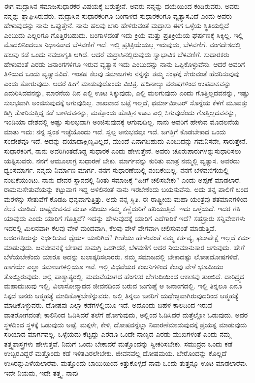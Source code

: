 ಈಗ ಮದ್ರಾಸಿನ ಸಮಾಜಸುಧಾರಕರ ವಿಷಯಕ್ಕೆ ಬರುತ್ತೇನೆ. ಅವರು ನನ್ನನ್ನು ದಯೆಯಿಂದ ಕಂಡಿರುವರು. ಅವರು ನನ್ನನ್ನು ಶ್ಲಾಘಿಸಿರುವರು. ಮದ್ರಾಸಿನ ಸುಧಾರಕರಿಗೂ ಬಂಗಾಳದ ಸುಧಾರಕರಿಗೂ ವ್ಯತ್ಯಾಸವಿದೆ ಎಂದು ಅವರು ಹೇಳುವುದನ್ನು ನಾನು ಒಪ್ಪುತ್ತೇನೆ. ನಾನು ಹಲವು ಬಾರಿ ಹೇಳಿರುವಂತೆ ಮದ್ರಾಸು ಈಗ ಒಳ್ಳೆಯ ಸ್ಥಿತಿಯಲ್ಲಿದೆ ಎಂಬುದು ಎಲ್ಲರಿಗೂ ಗೊತ್ತಿರಬಹುದು. ಬಂಗಾಳದಂತೆ ಇದು ಕ್ರಿಯೆ ಮತ್ತು ಪ್ರತಿಕ್ರಿಯೆಯ ಘರ್ಷಣಕ್ಕೆ ಸಿಕ್ಕಿಲ್ಲ. ಇಲ್ಲಿ ಮೊದಲಿನಿಂದಲೂ ನಿಧಾನವಾದ ಬೆಳವಣಿಗೆ ಇದೆ. ಇಲ್ಲಿ ಪ್ರತಿಕ್ರಿಯೆಯಲ್ಲ ಇರುವುದು, ಬೆಳವಣಿಗೆ. ವಂಗದೇಶದಲ್ಲಿ ಹಲವು ಕಡೆ ಒಂದು ನವಜಾಗೃತಿ ಆಗಿದೆ. ಆದರೆ ಮದ್ರಾಸಿನಲ್ಲಿರುವುದು ಸ್ವಾಭಾವಿಕ ಬೆಳವಣಿಗೆ. ಸುಧಾರಕರು ಹೇಳುವಂತೆ ಎರಡು ಜನಾಂಗಗಳಿಗೂ ಇರುವ ವ್ಯತ್ಯಾಸ ಇದು ಎಂಬುದನ್ನು ನಾನು ಒಪ್ಪಿಕೊಳ್ಳುವೆನು. ಆದರೆ ಅವರಿಗೆ ತಿಳಿಯದ ಒಂದು ವ್ಯತ್ಯಾಸವಿದೆ. ಇಂತಹ ಕೆಲವು ಸಮಾಜಗಳು ನನ್ನನ್ನು ತಮ್ಮ ಸಂಘಕ್ಕೆ ಸೇರುವಂತೆ ಹೆದರಿಸುವುವು ಎಂದು ತೋರುವುದು. ಆದರೆ ಹೀಗೆ ಮಾಡುವುದೊಂದು ವಿಚಿತ್ರ. ಹದಿನಾಲ್ಕು ವರುಷಗಳಿಂದ ಉಪವಾಸವನ್ನು ಎದುರಿಸಿದವನನ್ನು, ಮಾರನೆಯ ದಿನ ಎಲ್ಲಿ ಊಟ ಸಿಕ್ಕುವುದು, ಎಲ್ಲಿ ಮಲಗುವುದು ಎಂದು ಗೊತ್ತಿಲ್ಲದವನನ್ನು, ಇಷ್ಟು ಸುಲಭವಾಗಿ ಅಂಜಿಸುವುದಕ್ಕೆ ಆಗುವುದಿಲ್ಲ. ಶಾಖವಾದ ಬಟ್ಟೆ ಇಲ್ಲದೆ, ಥರ್ಮಾಮೀಟರ್​ ಸೊನ್ನೆಯ ಕೆಳಗೆ ಮೂವತ್ತು ಡಿಗ್ರಿ ತೋರಿಸುತ್ತಿದ್ದ ಕಡೆ ಬಾಳಿದವನನ್ನು, ಮತ್ತೊಂದು ಹೊತ್ತಿನ ಊಟ ಎಲ್ಲಿ ಸಿಗುವುದೆಂದು ಗೊತ್ತಿಲ್ಲದವನನ್ನು, ಇಂಡಿಯಾ ದೇಶದಲ್ಲಿ ಅಷ್ಟು ಸುಲಭವಾಗಿ ಅಂಜಿಸುವುದಕ್ಕೆ ಆಗುವುದಿಲ್ಲ. ನಾನು ಅವರಿಗೆ ಹೇಳುವ ಮೊದಲನೆಯ ಮಾತು ಇದು: ನನ್ನ ಸ್ವಂತ ಇಚ್ಛೆಯೊಂದು ಇದೆ. ಸ್ವಲ್ಪ ಅನುಭವವೂ ಇದೆ. ಜಗತ್ತಿಗೆ ಕೊಡಬೇಕಾದ ಒಂದು ಸಂದೇಶವೂ ಇದೆ. ಅದನ್ನು ದಯಾದಾಕ್ಷಿಣ್ಯವಿಲ್ಲದೆ, ಮುಂದೆ ಏನಾಗಬಹುದು ಎಂಬುದನ್ನು ಗಮನಿಸದೇ, ಸಾರುತ್ತೇನೆ. ಸುಧಾರಕರಿಗೆ, ನಾನು ಅವರಿಗಿಂತ\break ದೊಡ್ಡ ಸುಧಾರಕ ಎಂದು ಹೇಳುತ್ತೇನೆ. ಅವರು ಚೂರುಪಾರುಗಳನ್ನು\break ಸುಧಾರಿಸಲು ಯತ್ನಿಸುವರು. ನನಗೆ ಆಮೂಲಾಗ್ರ ಸುಧಾರಣೆ ಬೇಕು. ಮಾರ್ಗವನ್ನು ಕುರಿತು ಮಾತ್ರ ನಮ್ಮಲ್ಲಿ ವ್ಯತ್ಯಾಸ. ಅವರದು ಧ್ವಂಸಮಾರ್ಗ. ನನ್ನದು ನಿರ್ಮಾಣ ಮಾರ್ಗ. ನನಗೆ ಸುಧಾರಣೆಯಲ್ಲಿ ನಂಬಿಕೆಯಿಲ್ಲ. ನನಗೆ ಬೆಳವಣಿಗೆಯಲ್ಲಿ ನಂಬಿಕೆಯುಂಟು. ನಾನು ದೇವರ ಸ್ಥಾನದಲ್ಲಿ ನಿಂತು ಸಮಾಜಕ್ಕೆ “ಹೀಗೆ ಚಲಿಸಬೇಕು” ಎಂದು ಅಪ್ಪಣೆ ಮಾಡಲಾರೆ. ರಾಮನು\break ಸೇತುವೆಯನ್ನು ಕಟ್ಟುವಾಗ ಇದ್ದ ಅಳಿಲಿನಂತೆ ನಾನು ಇರಬೇಕೆಂದು ಬಯಸುವೆನು. ಅದು ತನ್ನ ಪಾಲಿಗೆ ಬಂದ ಮರಳನ್ನು ಸೇತುವೆಗೆ ಕೊಡಹಿ ಧನ್ಯವಾಗುತ್ತಿತ್ತು. ಅದು ನನ್ನ ಸ್ಥಿತಿ. ಈ ರಾಷ್ಟ್ರೀಯ ಮಹಾ ಯಂತ್ರವು ಶತಮಾನಗಳಿಂದ ಕೆಲಸ ಮಾಡಿದೆ. ರಾಷ್ಟ್ರಜೀವನದ ಮಹಾ ನದಿಯು ನಮ್ಮ ಕಣ್ಣೆದುರಿಗೆ ಹರಿಯುತ್ತಿದೆ. ಇದು ಒಳ್ಳೆಯದೆ. ಇದರ ಗತಿ ಯಾವುದು ಎಂದು ಯಾರಿಗೆ ಗೊತ್ತಿದೆ? ಇದನ್ನು ಹೇಳುವುದಕ್ಕೆ ಯಾರಿಗೆ ಎದೆಗಾರಿಕೆ ಇದೆ? ಸಹಸ್ರಾರು ಸನ್ನಿವೇಶಗಳು ಇದರಲ್ಲಿ ಮಿಲನವಾಗಿ ಕೆಲವು ವೇಳೆ ಮಂದವಾಗಿ, ಕೆಲವು ವೇಳೆ ವೇಗವಾಗಿ ಚಲಿಸುವಂತೆ ಮಾಡುತ್ತಿವೆ. ಅದರಗತಿಯನ್ನು ನಿರ್ಧರಿಸುವ ಧೈರ್ಯ ಯಾರಿಗಿದೆ? ಗೀತೆಯು ಹೇಳುವಂತೆ ನಮ್ಮ ಕರ್ತವ್ಯ, ಫಲಾಪೇಕ್ಷೆ ಇಲ್ಲದೆ ಕರ್ಮ ಮಾಡುವುದು. ಜನಜೀವನಕ್ಕೆ ಬೇಕಾದ ಸಾಮಗ್ರಿ ಒದಗಿದರೆ, ಬೆಳವಣಿಗೆ ಅದರ ನಿಯಮಾನುಸಾರ ಆಗುವುದು. ಹೇಗೆ ಬೆಳೆಯಬೇಕೆಂದು ಯಾರೂ ಅದನ್ನು ಬಲಾತ್ಕರಿಸಲಾರರು. ನಮ್ಮ ಸಮಾಜದಲ್ಲಿ ಬೇಕಾದಷ್ಟು ಲೋಪದೋಷಗಳಿವೆ. ಹಾಗೆಯೇ ಎಲ್ಲಾ ಸಮಾಜಗಳಲ್ಲಿಯೂ ಇವೆ. ಇಲ್ಲಿ ವಿಧವೆಯರ ಕಂಬನಿಗಳಿಂದ ಕೆಲವು ವೇಳೆ ಭೂಮಿಯು ತೊಯ್ದಿರುವುದು. ಅಲ್ಲಿ ಪಾಶ್ಚಾತ್ಯರಲ್ಲಿ, ಮದುವೆಯಾಗದ ಹೆಂಗಸರ ಬೇಗುದಿಯಿಂದ ಆಕಾಶವು ತುಂಬಿದೆ. ದಾರಿದ್ರ್ಯದ ಮಹಾದುಃಖವು ಇಲ್ಲಿ, ವಿಲಾಸೋನ್ಮಾದದ ಜೀವನದಿಂದ ಬರುವ ಜುಗುಪ್ಸೆ ಆ ಜನಾಂಗದಲ್ಲಿ. ಇಲ್ಲಿ ತಿನ್ನಲೂ ಏನೂ ಸಿಕ್ಕದೆ ಜನರು ಆತ್ಮಹತ್ಯೆ ಮಾಡಿಕೊಳ್ಳಬೇಕೆನ್ನುವರು. ಅಲ್ಲಿ ತಿನ್ನಲು ಜನರಿಗೆ ಯಥೇಚ್ಛವಾಗಿರುವುದರಿಂದ ಆತ್ಮಹತ್ಯೆ ಮಾಡಿಕೊಳ್ಳುವರು. ದೋಷವು ಎಲ್ಲಾ ಕಡೆಗಳಲ್ಲಿಯೂ ಇದೆ. ಅದೊಂದು ಬಹಳ ಕಾಲದಿಂದ ಇರುವ ವಾತರೋಗದಂತೆ; ಕಾಲಿನಿಂದ ಓಡಿಸಿದರೆ ತಲೆಗೆ ಹೋಗುವುದು, ಅಲ್ಲಿಂದ ಓಡಿಸಿದರೆ ಮತ್ತೆಲ್ಲೋ ಓಡುವುದು. ಅದರ ಸ್ಥಳದಿಂದ ಸ್ಥಳಕ್ಕೆ ಓಡುವುದು ಅಷ್ಟೆ. ಮಕ್ಕಳೇ, ಕೇಳಿ, ದೋಷವನ್ನೆಲ್ಲಾ ನಿವಾರಣೆ\break ಮಾಡುವುದಕ್ಕೆ ಪ್ರಯತ್ನ ಮಾಡುವುದು ಸರಿಯಾದ ಮಾರ್ಗವಲ್ಲ. ಒಳ್ಳೆಯದು ಕೆಟ್ಟದ್ದು ಎರಡೂ ಒಂದೇ ನಾಣ್ಯದ ಎರಡು ಮುಖಗಳಂತೆ ಎಂದು ನಮ್ಮ ತತ್ತ್ವಶಾಸ್ತ್ರಗಳು ಹೇಳುತ್ತವೆ. ನಿಮಗೆ ಒಂದು ಬೇಕಾದರೆ ಮತ್ತೊಂದನ್ನು ಸ್ವೀಕರಿಸಬೇಕು. ಸಮುದ್ರದ ಒಂದು ಕಡೆ ಉಬ್ಬರವಿದ್ದರೆ ಮತ್ತೊಂದು ಕಡೆ ಇಳಿತವಿರಲೇಬೇಕು. ಜೀವನವೆಲ್ಲ ದೋಷಮಯ. ಬೇರೊಂದನ್ನು ಕೊಲ್ಲದೆ ಉಸಿರನ್ನು\break ಎಳೆಯಲಾರೆವು. ಮತ್ತೊಂದು ಬಾಯಿಯಿಂದ ಕಿತ್ತುಕೊಳ್ಳದೆ ನಾವು ಒಂದು ತುತ್ತನ್ನೂ ಊಟ ಮಾಡಲಾರೆವು. ಇದೇ ನಿಯಮ, ಇದೇ ತತ್ತ್ವ. ನಾವು 